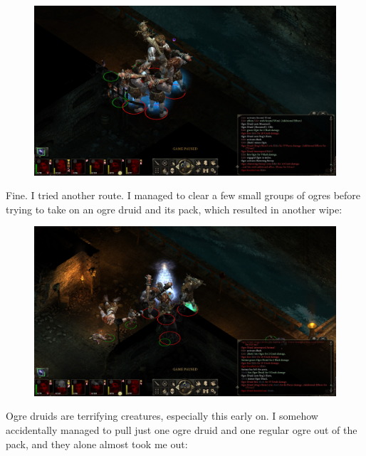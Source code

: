 \documentclass{article}
\begin{document}
\begin{figure}
\includegraphics[scale=0.33]{files/blog/2018_06_16_pillars_of_eternity_path_of_the_damned_act_i/2018_06_16_l3_ogre_wipe2.jpg}
\end{figure}

Fine.  I tried another route.  I managed to clear a few small groups of ogres before trying to take on an ogre druid and its pack, which resulted in another wipe:

\begin{figure}
\includegraphics[scale=0.33]{files/blog/2018_06_16_pillars_of_eternity_path_of_the_damned_act_i/2018_06_16_l3_ogre_wipe3.jpg}
\end{figure}

Ogre druids are terrifying creatures, especially this early on.  I somehow accidentally managed to pull just one ogre druid and one regular ogre out of the pack, and they alone almost took me out:
\end{document}

